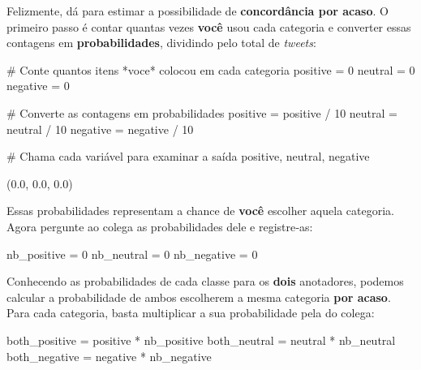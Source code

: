 \documentclass[
  brazilian,
  11pt,
]{article}
\newenvironment{Shaded}{\begin{snugshade}}{\end{snugshade}}
\newcommand{\CommentTok}[1]{\textcolor[rgb]{0.48,0.49,0.49}{#1}}
\newcommand{\DecValTok}[1]{\textcolor[rgb]{0.96,0.45,0.00}{#1}}
\newcommand{\NormalTok}[1]{\textcolor[rgb]{0.81,0.81,0.76}{#1}}
\newcommand{\OperatorTok}[1]{\textcolor[rgb]{0.81,0.81,0.76}{#1}}
\begin{document}
Felizmente, dá para estimar a possibilidade de \textbf{concordância por
acaso}. O primeiro passo é contar quantas vezes \textbf{você} usou cada
categoria e converter essas contagens em \textbf{probabilidades},
dividindo pelo total de \emph{tweets}:

\begin{Shaded}
\begin{Highlighting}[]
\CommentTok{\# Conte quantos itens *voce* colocou em cada categoria}
\NormalTok{positive }\OperatorTok{=} \DecValTok{0}
\NormalTok{neutral }\OperatorTok{=} \DecValTok{0}
\NormalTok{negative }\OperatorTok{=} \DecValTok{0}

\CommentTok{\# Converte as contagens em probabilidades}
\NormalTok{positive }\OperatorTok{=}\NormalTok{ positive }\OperatorTok{/} \DecValTok{10}
\NormalTok{neutral }\OperatorTok{=}\NormalTok{ neutral }\OperatorTok{/} \DecValTok{10}
\NormalTok{negative }\OperatorTok{=}\NormalTok{ negative }\OperatorTok{/} \DecValTok{10}

\CommentTok{\# Chama cada variável para examinar a saída}
\NormalTok{positive, neutral, negative}
\end{Highlighting}
\end{Shaded}

\begin{Shaded}
\begin{Highlighting}[]
\NormalTok{(0.0, 0.0, 0.0)}
\end{Highlighting}
\end{Shaded}

Essas probabilidades representam a chance de \textbf{você} escolher
aquela categoria. Agora pergunte ao colega as probabilidades dele e
registre‑as:

\begin{Shaded}
\begin{Highlighting}[]
\NormalTok{nb\_positive }\OperatorTok{=} \DecValTok{0}
\NormalTok{nb\_neutral }\OperatorTok{=} \DecValTok{0}
\NormalTok{nb\_negative }\OperatorTok{=} \DecValTok{0}
\end{Highlighting}
\end{Shaded}

Conhecendo as probabilidades de cada classe para os \textbf{dois}
anotadores, podemos calcular a probabilidade de ambos escolherem a mesma
categoria \textbf{por acaso}. Para cada categoria, basta multiplicar a
sua probabilidade pela do colega:

\begin{Shaded}
\begin{Highlighting}[]
\NormalTok{both\_positive }\OperatorTok{=}\NormalTok{ positive }\OperatorTok{*}\NormalTok{ nb\_positive}
\NormalTok{both\_neutral }\OperatorTok{=}\NormalTok{ neutral }\OperatorTok{*}\NormalTok{ nb\_neutral}
\NormalTok{both\_negative }\OperatorTok{=}\NormalTok{ negative }\OperatorTok{*}\NormalTok{ nb\_negative}
\end{Highlighting}
\end{Shaded}
\end{document}
